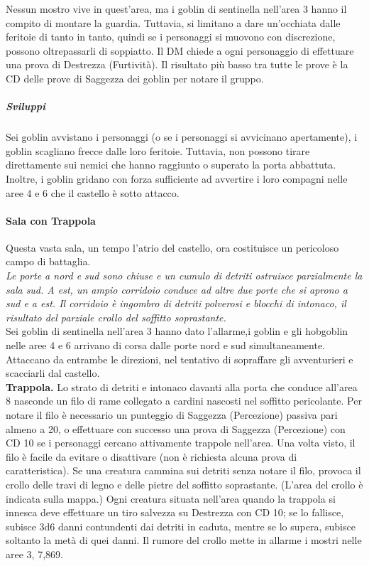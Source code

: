 \documentclass{article}
\begin{document}
Nessun mostro vive in quest'area, ma i goblin di sentinella
nell’area 3 hanno il compito di montare la guardia. Tuttavia,
si limitano a dare un'occhiata dalle feritoie di tanto in tanto,
quindi se i personaggi si muovono con discrezione, possono oltrepassarli di soppiatto. Il DM chiede a ogni personaggio di
effettuare una prova di Destrezza (Furtività). Il risultato più
basso tra tutte le prove è la CD delle prove di Saggezza dei
goblin per notare il gruppo.

\subparagraph{Sviluppi} Sei goblin avvistano i personaggi (o se i personaggi si
avvicinano apertamente), i goblin scagliano frecce dalle loro
feritoie. Tuttavia, non possono tirare direttamente sui nemici
che hanno raggiunto o superato la porta abbattuta. Inoltre,
i goblin gridano con forza sufficiente ad avvertire i loro
compagni nelle aree 4 e 6 che il castello è sotto attacco.

\paragraph{Sala con Trappola}Questa vasta sala, un tempo l’atrio del castello, ora costituisce
un pericoloso campo di battaglia.\\
\textit{Le porte a nord e sud sono chiuse e un cumulo di detriti
ostruisce parzialmente la sala sud. A est, un ampio corridoio
conduce ad altre due porte che si aprono a sud e a est. Il
corridoio è ingombro di detriti polverosi e blocchi di intonaco,
il risultato del parziale crollo del soffitto soprastante.} \\

Sei goblin di sentinella nell’area 3 hanno dato l’allarme,i
goblin e gli hobgoblin nelle aree 4 e 6 arrivano di corsa dalle
porte nord e sud simultaneamente. Attaccano da entrambe
le direzioni, nel tentativo di sopraffare gli avventurieri e
scacciarli dal castello. \\ 
\textbf{Trappola.} Lo strato di detriti e intonaco davanti alla porta
che conduce all'area 8 nasconde un filo di rame collegato a
cardini nascosti nel soffitto pericolante. Per notare il filo è
necessario un punteggio di Saggezza (Percezione) passiva
pari almeno a 20, o effettuare con successo una prova di
Saggezza (Percezione) con CD 10 se i personaggi cercano
attivamente trappole nell’area. Una volta visto, il filo è facile
da evitare o disattivare (non è richiesta alcuna prova di
caratteristica).
Se una creatura cammina sui detriti senza notare il filo,
provoca il crollo delle travi di legno e delle pietre del soffitto
soprastante. (L'area del crollo è indicata sulla mappa.) Ogni
creatura situata nell’area quando la trappola si innesca
deve effettuare un tiro salvezza su Destrezza con CD 10;
se lo fallisce, subisce 3d6 danni contundenti dai detriti in
caduta, mentre se lo supera, subisce soltanto la metà di quei
danni. Il rumore del crollo mette in allarme i mostri nelle
aree 3, 7,869.
\end{document}
